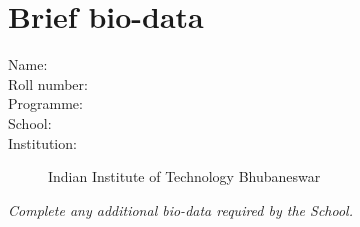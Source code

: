 \clearpage
\chapter*{Brief bio-data}
\begin{description}
\item[Name:] \StudentName
\item[Roll number:] \RollNumber
\item[Programme:] \ProgrammeName
\item[School:] \SchoolName
\item[Institution:] Indian Institute of Technology Bhubaneswar
\end{description}
\textit{Complete any additional bio-data required by the School.}
